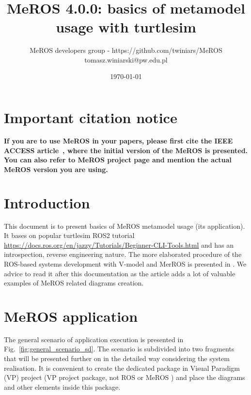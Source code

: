 \documentclass[11pt,oneside,a4paper]{report}
\begin{document}
	
\title{MeROS 4.0.0: basics of metamodel usage with turtlesim}
\author{MeROS developers group - https://github.com/twiniars/MeROS \\ tomasz.winiarski@pw.edu.pl}
\date{\today}
\maketitle

	
\chapter*{Important citation notice}

\textbf{If you are to use MeROS in your papers, please first cite the IEEE ACCESS  article~\cite{meros-access}, where the initial version of the MeROS is presented. You can also refer to MeROS project page \cite{meros-www} and mention the actual MeROS version you are using.}
	
\chapter{Introduction}
\label{ch:introduction}

	This document is to present basics of MeROS metamodel usage (its application). It bases on popular turtlesim ROS2 tutorial \url{https://docs.ros.org/en/jazzy/Tutorials/Beginner-CLI-Tools.html} and has an introspection, reverse engineering nature. The more elaborated procedure of the ROS-based systems development with V-model and MerROS is presented in \cite{winiarski2025-v-model}. We advice to read it after this documentation as the article adds a lot of valuable examples of MeROS related diagrams creation. 

\chapter{MeROS application}
\label{ch:application}

The general scenario of application execution is presented in Fig.~\ref{fig:general_scenario_sd}. The scenario is subdivided into two fragments that will be presented further on in the detailed way considering the system realisation. It is convenient to create the dedicated package in Visual Paradigm (VP) project (VP project package, not ROS or MeROS \stPackage{}) and place the diagrams and other elements inside this package.
\end{document}
